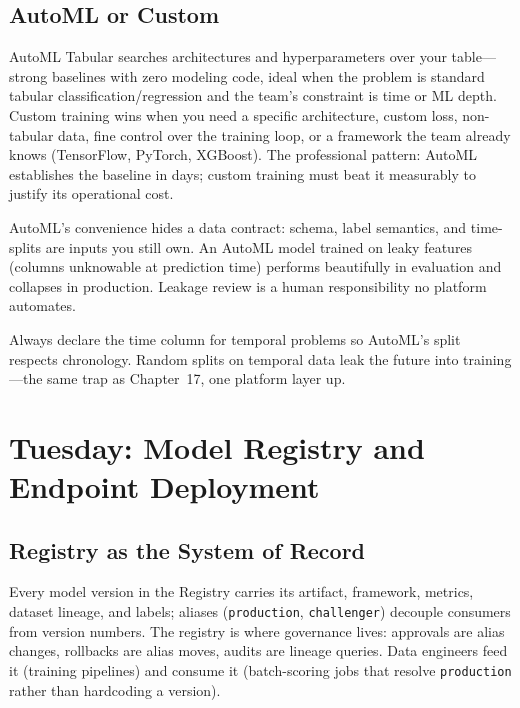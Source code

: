 \subsection{AutoML or Custom}
AutoML Tabular searches architectures and hyperparameters over your table---strong baselines with zero modeling code, ideal when the problem is standard tabular classification/regression and the team's constraint is time or ML depth. Custom training wins when you need a specific architecture, custom loss, non-tabular data, fine control over the training loop, or a framework the team already knows (TensorFlow, PyTorch, XGBoost). The professional pattern: AutoML establishes the baseline in days; custom training must beat it measurably to justify its operational cost.

\begin{pitfall}
AutoML's convenience hides a data contract: schema, label semantics, and time-splits are inputs you still own. An AutoML model trained on leaky features (columns unknowable at prediction time) performs beautifully in evaluation and collapses in production. Leakage review is a human responsibility no platform automates.
\end{pitfall}

\begin{tipbox}
Always declare the time column for temporal problems so AutoML's split respects chronology. Random splits on temporal data leak the future into training---the same trap as Chapter~17, one platform layer up.
\end{tipbox}

\section{Tuesday: Model Registry and Endpoint Deployment}

\subsection{Registry as the System of Record}
Every model version in the Registry carries its artifact, framework, metrics, dataset lineage, and labels; aliases (\texttt{production}, \texttt{challenger}) decouple consumers from version numbers. The registry is where governance lives: approvals are alias changes, rollbacks are alias moves, audits are lineage queries. Data engineers feed it (training pipelines) and consume it (batch-scoring jobs that resolve \texttt{production} rather than hardcoding a version).

